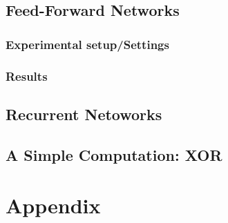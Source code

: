 \documentclass[a4paper]{article}
\begin{document}
\subsection{Feed-Forward Networks}

\subsubsection{Experimental setup/Settings}

\subsubsection{Results}

\subsection{Recurrent Netoworks}
\subsection{A Simple Computation: XOR}




\section{Appendix}
\end{document}
